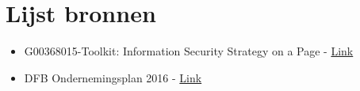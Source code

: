 \documentclass[11pt]{article}
\begin{document}
\section{Lijst bronnen}
\label{sec:org24c2a4a}

\begin{itemize}
\item G00368015-Toolkit: Information Security Strategy on a Page - \href{https://www.gartner.com/document/3892398?ref=cust\_reco\_sdemail\&docType=RESEARCH}{Link}
\item DFB Ondernemingsplan 2016 - \href{http://fb.vonet.be/organisatie/departement-fb/ondernemingsplan}{Link}
\end{itemize}
\end{document}
